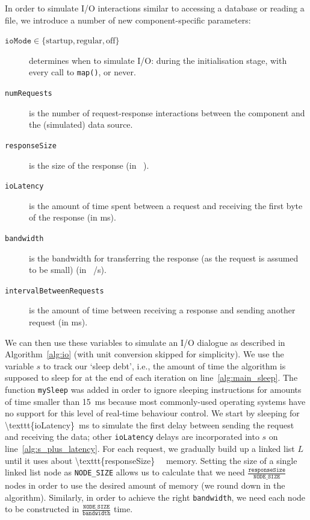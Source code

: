 \documentclass{article}
\begin{document}
In order to simulate I/O interactions similar to accessing a database or reading
a file, we introduce a number of new component-specific parameters:
\begin{description}
\item[$\texttt{ioMode} \in \{ \text{startup}, \text{regular}, \text{off} \}$]
  determines when to simulate I/O: during the initialisation stage, with every
  call to \texttt{map()}, or never.
\item[\texttt{numRequests}] is the number of request-response interactions
  between the component and the (simulated) data source.
\item[\texttt{responseSize}] is the size of the response (in \si{\kibi\byte}).
\item[\texttt{ioLatency}] is the amount of time spent between a request
  and receiving the first byte of the response (in \si{\milli\second}).
\item[\texttt{bandwidth}] is the bandwidth for transferring the response (as the
  request is assumed to be small) (in
  \si[per-mode=symbol]{\mebi\bit\per\second}).
\item[\texttt{intervalBetweenRequests}] is the amount of time between receiving
  a response and sending another request (in \si{\milli\second}).
\end{description}

We can then use these variables to simulate an I/O dialogue as described in
Algorithm~\ref{alg:io} (with unit conversion skipped for
simplicity). We use the variable $s$ to track our `sleep debt', i.e., the amount
of time the algorithm is supposed to sleep for at the end of each iteration on
line~\ref{alg:main_sleep}. The function \texttt{mySleep} was added in order to
ignore sleeping instructions for amounts of time smaller than
\SI{15}{\milli\second} because most commonly-used operating systems have no
support for this level of real-time behaviour control. We start by sleeping for
\SI[number-math-rm=\mathnormal,parse-numbers=false]{\texttt{ioLatency}}{\milli\second}
to simulate the first delay between sending the request and receiving the data;
other \texttt{ioLatency} delays are incorporated into $s$ on
line~\ref{alg:s_plus_latency}. For each request, we gradually build up a linked
list $L$ until it uses about
\SI[number-math-rm=\mathnormal,parse-numbers=false]{\texttt{responseSize}}{\kibi\byte}
memory. Setting the size of a single linked list node as \texttt{NODE\_SIZE}
allows us to calculate that we need
$\frac{\texttt{responseSize}}{\texttt{NODE\_SIZE}}$ nodes in order to use the
desired amount of memory (we round down in the algorithm). Similarly, in order
to achieve the right \texttt{bandwidth}, we need each node to be constructed in
$\frac{\texttt{NODE\_SIZE}}{\texttt{bandwidth}}$ time.
\end{document}
